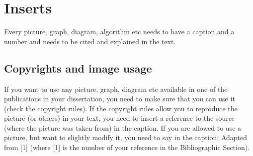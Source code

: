 \section{Inserts}
Every picture, graph, diagram, algorithm etc needs to have a caption and a number and needs to
be cited and explained in the text.

\subsection{Copyrights and image usage}
If you want to use any picture, graph, diagram etc available in one of the publications in your
dissertation, you need to make sure that you can use it (check the copyright rules). If the copyright
rules allow you to reproduce the picture (or others) in your text, you need to insert a reference to the
source (where the picture was taken from) in the caption. If you are allowed to use a picture, but
want to slightly modify it, you need to say in the caption: Adapted from [1] (where [1] is the
number of your reference in the Bibliographic Section).


